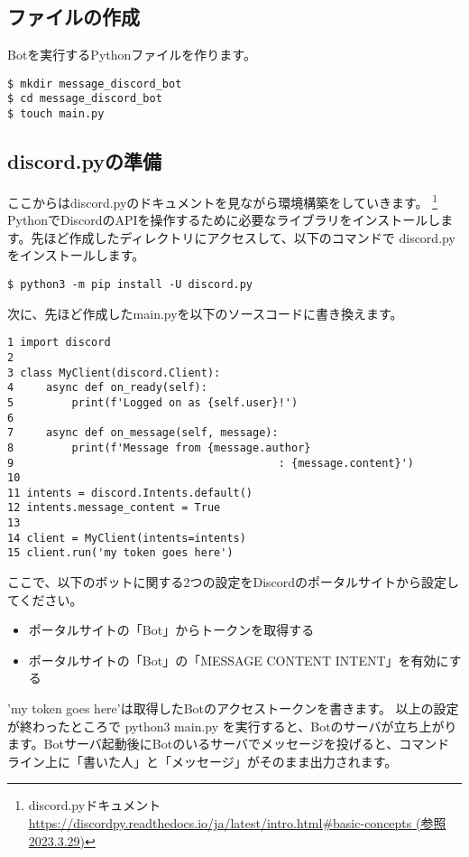 \subsection{ファイルの作成}
Botを実行するPythonファイルを作ります。
\begin{shaded}
  \begin{verbatim}
$ mkdir message_discord_bot
$ cd message_discord_bot
$ touch main.py
\end{verbatim}
\end{shaded}

\subsection{discord.pyの準備}
ここからはdiscord.pyのドキュメントを見ながら環境構築をしていきます。
\footnote{discord.pyドキュメント\url{https://discordpy.readthedocs.io/ja/latest/intro.html\#basic-concepts (参照2023.3.29)}}
PythonでDiscordのAPIを操作するために必要なライブラリをインストールします。先ほど作成したディレクトリにアクセスして、以下のコマンドで discord.py をインストールします。
\begin{shaded}
  \begin{verbatim}
$ python3 -m pip install -U discord.py
\end{verbatim}
\end{shaded}
次に、先ほど作成したmain.pyを以下のソースコードに書き換えます。
\begin{tcolorbox}[breakable]
  \begin{verbatim}
1 import discord
2 
3 class MyClient(discord.Client):
4     async def on_ready(self):
5         print(f'Logged on as {self.user}!')
6 
7     async def on_message(self, message):
8         print(f'Message from {message.author}
9                                         : {message.content}')
10
11 intents = discord.Intents.default()
12 intents.message_content = True
13
14 client = MyClient(intents=intents)
15 client.run('my token goes here')
\end{verbatim}
\end{tcolorbox}
ここで、以下のボットに関する2つの設定をDiscordのポータルサイトから設定してください。
\begin{itemize}
  \item ポータルサイトの「Bot」からトークンを取得する
  \item ポータルサイトの「Bot」の「MESSAGE CONTENT INTENT」を有効にする
\end{itemize}
'my token goes here'は取得したBotのアクセストークンを書きます。
以上の設定が終わったところで python3 main.py を実行すると、Botのサーバが立ち上がります。Botサーバ起動後にBotのいるサーバでメッセージを投げると、コマンドライン上に「書いた人」と「メッセージ」がそのまま出力されます。

